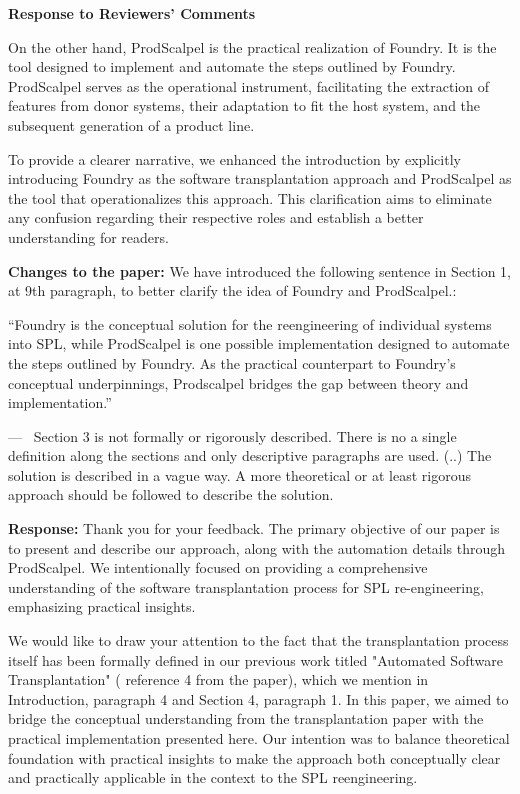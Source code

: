 \documentclass[a4paper,11pt]{letter}
\newcounter{reviewer}
\newcounter{point}[reviewer]
\renewcommand{\thepoint}{P\,\thereviewer.\arabic{point}}
\newenvironment{point}
   {\refstepcounter{point} \bigskip \noindent {\textbf{Reviewer~Point~\thepoint} } ---\ }
   {\par }
\newcommand{\response}[1]{\textbf{Response:} \begingroup\color{black}#1\endgroup}
\newcommand{\changes}[1]{\textbf{Changes to the paper:} \begingroup\color{blue}#1\endgroup}
\begin{document}
\begin{letter}{\textbf{Response to Reviewers' Comments}}
{On the other hand, ProdScalpel is the practical realization of Foundry. It is the tool designed to implement and automate the steps outlined by Foundry. ProdScalpel serves as the operational instrument, facilitating the extraction of features from donor systems, their adaptation to fit the host system, and the subsequent generation of a product line.

To provide a clearer narrative, we enhanced the introduction by explicitly introducing Foundry as the software transplantation approach and ProdScalpel as the tool that operationalizes this approach. This clarification aims to eliminate any confusion regarding their respective roles and establish a better understanding for readers.}

\changes{We have introduced the following sentence in Section 1, at 9th paragraph, to better clarify the idea of Foundry and ProdScalpel.:

``Foundry is the conceptual solution for the reengineering of individual systems into SPL, while ProdScalpel is one possible implementation designed to automate the steps outlined by Foundry. As the practical counterpart to Foundry's conceptual underpinnings, Prodscalpel bridges the gap between theory and implementation.''}

\begin{point} 
Section 3 is not formally or rigorously described. There is no a single definition along the sections and only descriptive paragraphs are used. (..)
The solution is described in a vague way. A more theoretical or at least rigorous approach should be followed to describe the solution. 
\end{point}

\response{Thank you for your feedback. The primary objective of our paper is to present and describe our approach, along with the automation details through ProdScalpel. We intentionally focused on providing a comprehensive understanding of the software transplantation process for SPL re-engineering, emphasizing practical insights.

We would like to draw your attention to the fact that the transplantation process itself has been formally defined in our previous work titled "Automated Software Transplantation" ( reference 4 from the paper), which we mention in Introduction, paragraph 4 and Section 4, paragraph 1. In this paper, we aimed to bridge the conceptual understanding from the transplantation paper with the practical implementation presented here. Our intention was to balance theoretical foundation with practical insights to make the approach both conceptually clear and practically applicable in the context to the SPL reengineering. }


\end{letter}
\end{document}
